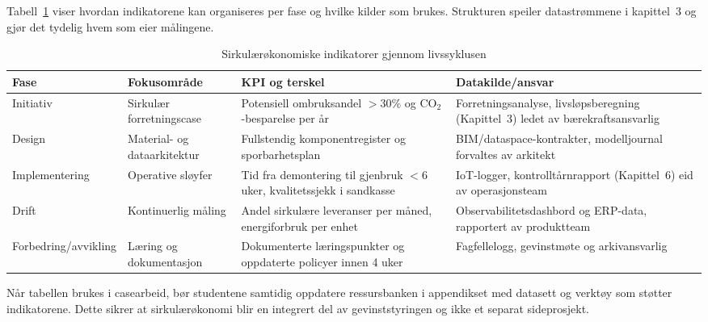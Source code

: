 Tabell~\ref{tab:sirkular-livssyklus} viser hvordan indikatorene kan organiseres per fase og hvilke kilder som brukes. Strukturen speiler datastrømmene i kapittel~3 og gjør det tydelig hvem som eier målingene.

\begin{table}[h]
    \centering
    \caption{Sirkulærøkonomiske indikatorer gjennom livssyklusen}
    \label{tab:sirkular-livssyklus}
    \begin{tabular}{p{2.7cm}p{3.7cm}p{3.5cm}p{3.0cm}}
        \toprule
        Fase & Fokusområde & KPI og terskel & Datakilde/ansvar \\
        \midrule
        Initiativ & Sirkulær forretningscase & Potensiell ombruksandel $>30\%$ og CO$_2$-besparelse per år & Forretningsanalyse, livsløpsberegning (Kapittel~3) ledet av bærekraftsansvarlig \\
        Design & Material- og dataarkitektur & Fullstendig komponentregister og sporbarhetsplan & BIM/dataspace-kontrakter, modelljournal forvaltes av arkitekt \\
        Implementering & Operative sløyfer & Tid fra demontering til gjenbruk $<6$ uker, kvalitetssjekk i sandkasse & IoT-logger, kontrolltårnrapport (Kapittel~6) eid av operasjonsteam \\
        Drift & Kontinuerlig måling & Andel sirkulære leveranser per måned, energiforbruk per enhet & Observabilitetsdashbord og ERP-data, rapportert av produktteam \\
        Forbedring/avvikling & Læring og dokumentasjon & Dokumenterte læringspunkter og oppdaterte policyer innen 4 uker & Fagfellelogg, gevinstmøte og arkivansvarlig \\
        \bottomrule
    \end{tabular}
\end{table}

Når tabellen brukes i casearbeid, bør studentene samtidig oppdatere ressursbanken i appendikset med datasett og verktøy som støtter indikatorene. Dette sikrer at sirkulærøkonomi blir en integrert del av gevinststyringen og ikke et separat sideprosjekt.

